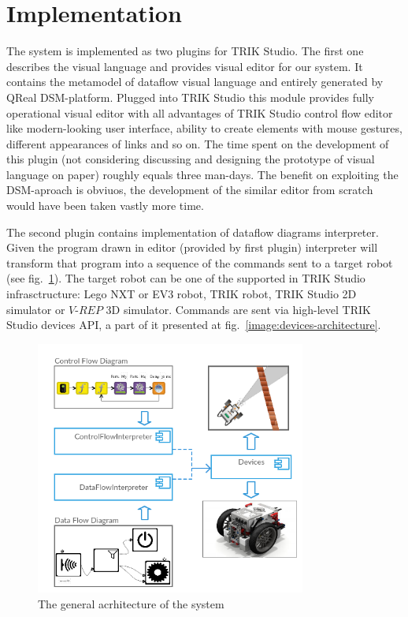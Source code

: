 \documentclass[conference,compsoc]{IEEEtran}
\begin{document}

\section{Implementation}
\label{sec:Implementation}
The system is implemented as two plugins for TRIK Studio. The first one describes the visual language and provides visual editor for our system. It contains the metamodel of dataflow visual language and entirely generated by QReal DSM-platform. Plugged into TRIK Studio this module provides fully operational visual editor with all advantages of TRIK Studio control flow editor like modern-looking user interface, ability to create elements with mouse gestures, different appearances of links and so on. The time spent on the development of this plugin (not considering discussing and designing the prototype of visual language on paper) roughly equals three man-days. The benefit on exploiting the DSM-aproach is obviuos, the development of the similar editor from scratch would have been taken vastly more time.

The second plugin contains implementation of dataflow diagrams interpreter. Given the program drawn in editor (provided by first plugin) interpreter will transform that program into a sequence of the commands sent to a target robot (see fig.~\ref{image:common-architecture}). The target robot can be one of the supported in TRIK Studio infrasctructure: Lego NXT or EV3 robot, TRIK robot, TRIK Studio 2D simulator or $V\mbox{-}REP$ 3D simulator\cite{rohmer2013v}. Commands are sent via high-level TRIK Studio devices API, a part of it presented at fig.~\ref{image:devices-architecture}.

\begin{figure}[ht]
	\centering
	\includegraphics[width=3.5in]{Common.png}
	\caption{The general acrhitecture of the system}
	\label{image:common-architecture}
\end{figure}
\end{document}
